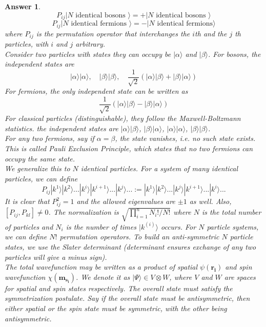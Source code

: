 \documentclass[a4paper]{article}
\newtheorem{ans}{Answer}[subsection]
\theoremstyle{new}
\begin{document}
\begin{ans}
$$P_{ij}|N\text{ identical bosons }\rangle=+|N\text{ identical bosons }\rangle$$
$$P_{ij}|N\text{ identical fermions }\rangle=-|N\text{ identical fermions}\rangle$$
where $P_{ij}$ is the permutation operator that interchanges the $i$th and the $j$ th particles, with $i$ and $j$ arbitrary.\\[5pt]
Consider two particles with states they can occupy be $|\alpha\rangle$ and $|\beta\rangle$. For bosons, the independent states are
$$|\alpha\rangle|\alpha\rangle,\quad|\beta\rangle|\beta\rangle,\quad\frac{1}{\sqrt{2}}(|\alpha\rangle|\beta\rangle+|\beta\rangle|\alpha\rangle)$$
For fermions, the only independent state can be written as
$$\frac{1}{\sqrt{2}}(|\alpha\rangle|\beta\rangle-|\beta\rangle|\alpha\rangle)$$
For classical particles (distinguishable), they follow the Maxwell-Boltzmann statistics. the independent states are $|\alpha\rangle|\beta\rangle$, $|\beta\rangle|\alpha\rangle$, $|\alpha\rangle|\alpha\rangle$, $|\beta\rangle|\beta\rangle$.\\[5pt]
For any two fermions, say if $\alpha=\beta$, the state vanishes, i.e. no such state exists. This is called Pauli Exclusion Principle, which states that no two fermions can occupy the same state.\\[5pt]
We generalize this to $N$ identical particles. For a system of many identical particles, we can define
$$P_{ij}|k^1\rangle|k^2\rangle...|k^i\rangle|k^{i+1}\rangle...|k^j\rangle...:=|k^1\rangle|k^2\rangle...|k^j\rangle|k^{i+1}\rangle...|k^i\rangle...$$
It is clear that $P_{ij}^2=1$ and the allowed eigenvalues are $\pm 1$ as well. Also, $[P_{ij},P_{kl}]\neq 0$. The normalization is $\sqrt{\prod_{i=1}^nN_i!/N!}$ where $N$ is the total number of particles and $N_i$ is the number of times $|k^{(i)}\rangle$ occurs. For $N$ particle systems, we can define $N!$ permutation operators. To build an anti-symmetric $N$ particle states, we use the Slater determinant (determinant ensures exchange of any two particles will give a minus sign).\\[5pt]
The total wavefunction may be written as a product of spatial $\psi(\mathbf{r_i})$ and spin wavefunction $\chi(\mathbf{m_{s_i}})$. We denote it as $|\Psi\rangle\in V\otimes W$, where $V$ and $W$ are spaces for spatial and spin states respectively. The overall state must satisfy the symmetrization postulate. Say if the overall state must be antisymmetric, then either spatial or the spin state must be symmetric, with the other being antisymmetric.

\end{ans}
\end{document}
